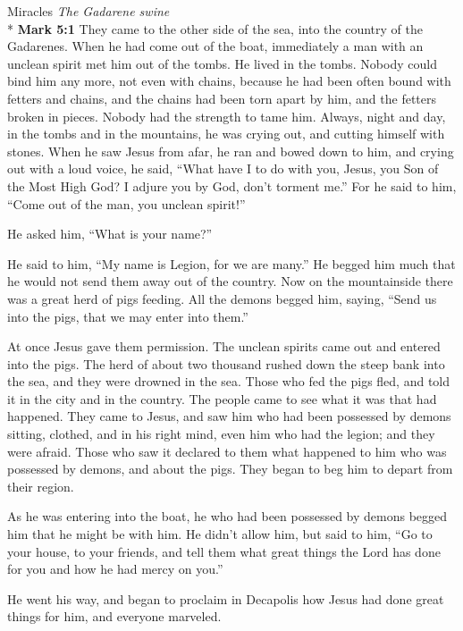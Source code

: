 \documentclass[10pt,twoside]{article} %
\newcommand{\quotesize}{\normalsize{}}
\newenvironment{quotetext}{\begingroup\quotesize}{\endgroup}
\newcommand{\intex}[1]{\index[texts]{#1}}
\newcommand{\bible}[2]{\begin{quotetext}\textbf{#1}\intex{#1} #2\end{quotetext}}
\newcommand{\gospelmark}[2]{\bible{Mark #1}{#2}}
\newcommand{\subhead}[1]{\emph{#1}\\*}
\begin{document}
\begin{section}{Miracles}
\subhead{The Gadarene swine}
\gospelmark{5:1}{
   They came to the other side of the sea, into the country of the Gadarenes.   When he had come out of the boat, immediately a man with an unclean spirit met him out of the tombs.   He lived in the tombs. Nobody could bind him any more, not even with chains,   because he had been often bound with fetters and chains, and the chains had been torn apart by him, and the fetters broken in pieces. Nobody had the strength to tame him.   Always, night and day, in the tombs and in the mountains, he was crying out, and cutting himself with stones.   When he saw Jesus from afar, he ran and bowed down to him,   and crying out with a loud voice, he said, ``What have I to do with you, Jesus, you Son of the Most High God? I adjure you by God, don't torment me.''   For he said to him, ``Come out of the man, you unclean spirit!''

  He asked him, ``What is your name?''

He said to him, ``My name is Legion, for we are many.''   He begged him much that he would not send them away out of the country.   Now on the mountainside there was a great herd of pigs feeding.   All the demons begged him, saying, ``Send us into the pigs, that we may enter into them.''

  At once Jesus gave them permission. The unclean spirits came out and entered into the pigs. The herd of about two thousand rushed down the steep bank into the sea, and they were drowned in the sea.   Those who fed the pigs fled, and told it in the city and in the country.
The people came to see what it was that had happened.   They came to Jesus, and saw him who had been possessed by demons sitting, clothed, and in his right mind, even him who had the legion; and they were afraid.   Those who saw it declared to them what happened to him who was possessed by demons, and about the pigs.   They began to beg him to depart from their region.

  As he was entering into the boat, he who had been possessed by demons begged him that he might be with him.   He didn't allow him, but said to him, ``Go to your house, to your friends, and tell them what great things the Lord has done for you and how he had mercy on you.''

  He went his way, and began to proclaim in Decapolis how Jesus had done great things for him, and everyone marveled.
}


\end{section}
\end{document}
